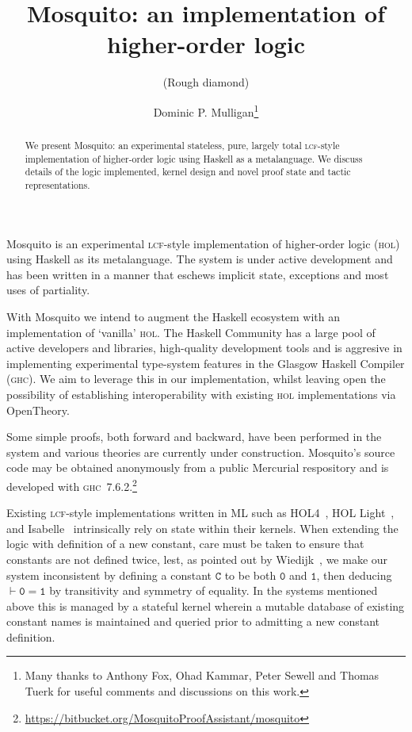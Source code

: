 \documentclass{llncs}
\author{Dominic P. Mulligan\thanks{Many thanks to Anthony Fox, Ohad Kammar, Peter Sewell and Thomas Tuerk for useful comments and discussions on this work.}}
\title{Mosquito: an implementation of higher-order logic}
\subtitle{(Rough diamond)}
\institute{Computer Laboratory, University of Cambridge}
\newcommand{\mosquito}{Mosquito\xspace}
\begin{document}
\maketitle

\begin{abstract}
We present \mosquito: an experimental stateless, pure, largely total \textsc{lcf}-style implementation of higher-order logic using Haskell as a metalanguage.
We discuss details of the logic implemented, kernel design and novel proof state and tactic representations.
\end{abstract}

\mosquito is an experimental \textsc{lcf}-style implementation of higher-order logic (\textsc{hol}) using Haskell as its metalanguage.
The system is under active development and has been written in a manner that eschews implicit state, exceptions and most uses of partiality.

With \mosquito we intend to augment the Haskell ecosystem with an implementation of `vanilla' \textsc{hol}.
The Haskell Community has a large pool of active developers and libraries, high-quality development tools and is aggresive in implementing experimental type-system features in the Glasgow Haskell Compiler (\textsc{ghc}).
We aim to leverage this in our implementation, whilst leaving open the possibility of establishing interoperability with existing \textsc{hol} implementations via OpenTheory.

Some simple proofs, both forward and backward, have been performed in the system and various theories are currently under construction.
\mosquito's source code may be obtained anonymously from a public Mercurial respository and is developed with \textsc{ghc}~7.6.2.\footnote{\url{https://bitbucket.org/MosquitoProofAssistant/mosquito}}

Existing \textsc{lcf}-style implementations written in ML such as HOL4~\cite{gordon:introduction:1993}, HOL Light~\cite{harrison:hol:2009}, and Isabelle~\cite{wenzel:isabelle:2008} intrinsically rely on state within their kernels.
When extending the logic with definition of a new constant, care must be taken to ensure that constants are not defined twice, lest, as pointed out by Wiedijk~\cite{wiedijk:stateless:2011}, we make our system inconsistent by defining a constant $\mathtt{C}$ to be both $\mathtt{0}$ and $\mathtt{1}$, then deducing $\vdash \mathtt{0 = 1}$ by transitivity and symmetry of equality.
In the systems mentioned above this is managed by a stateful kernel wherein a mutable database of existing constant names is maintained and queried prior to admitting a new constant definition.
\end{document}
